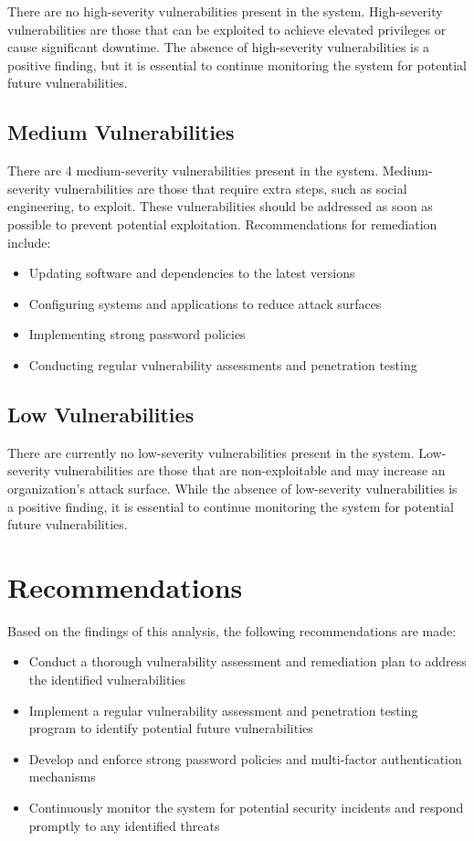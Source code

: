 There are no high-severity vulnerabilities present in the system. High-severity vulnerabilities are those that can be exploited to achieve elevated privileges or cause significant downtime. The absence of high-severity vulnerabilities is a positive finding, but it is essential to continue monitoring the system for potential future vulnerabilities.

\subsection{Medium Vulnerabilities}

There are 4 medium-severity vulnerabilities present in the system. Medium-severity vulnerabilities are those that require extra steps, such as social engineering, to exploit. These vulnerabilities should be addressed as soon as possible to prevent potential exploitation. Recommendations for remediation include:
\begin{itemize}
\item Updating software and dependencies to the latest versions
\item Configuring systems and applications to reduce attack surfaces
\item Implementing strong password policies
\item Conducting regular vulnerability assessments and penetration testing
\end{itemize}
\subsection{Low Vulnerabilities}

There are currently no low-severity vulnerabilities present in the system. Low-severity vulnerabilities are those that are non-exploitable and may increase an organization's attack surface. While the absence of low-severity vulnerabilities is a positive finding, it is essential to continue monitoring the system for potential future vulnerabilities.

\section{Recommendations}

Based on the findings of this analysis, the following recommendations are made:
\begin{itemize}
\item Conduct a thorough vulnerability assessment and remediation plan to address the identified vulnerabilities
\item Implement a regular vulnerability assessment and penetration testing program to identify potential future vulnerabilities
\item Develop and enforce strong password policies and multi-factor authentication mechanisms
\item Continuously monitor the system for potential security incidents and respond promptly to any identified threats
\end{itemize}



